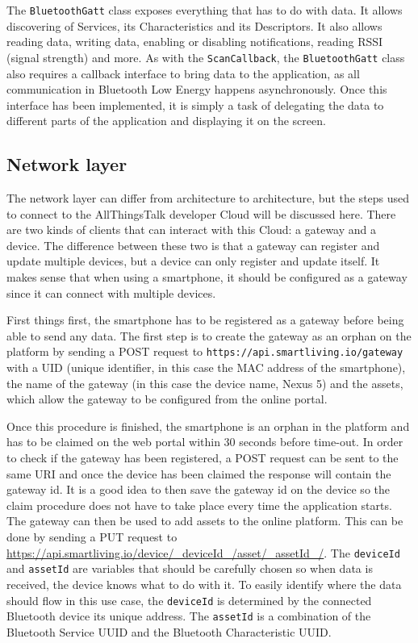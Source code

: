 \documentclass[pdftex,a4paper,12pt,twoside]{report}
\begin{document}
The \texttt{BluetoothGatt} class exposes everything that has to do with data. It allows discovering of Services, its Characteristics and its Descriptors. It also allows reading data, writing data, enabling or disabling notifications, reading RSSI (signal strength) and more. As with the \texttt{ScanCallback}, the \texttt{BluetoothGatt} class also requires a callback interface to bring data to the application, as all communication in Bluetooth Low Energy happens asynchronously. Once this interface has been implemented, it is simply a task of delegating the data to different parts of the application and displaying it on the screen.

\subsection{Network layer}
\label{subsec:networklayer}
The network layer can differ from architecture to architecture, but the steps used to connect to the AllThingsTalk developer Cloud will be discussed here. There are two kinds of clients that can interact with this Cloud: a gateway and a device. The difference between these two is that a gateway can register and update multiple devices, but a device can only register and update itself. It makes sense that when using a smartphone, it should be configured as a gateway since it can connect with multiple devices.

First things first, the smartphone has to be registered as a gateway before being able to send any data. The first step is to create the gateway as an orphan on the platform by sending a POST request to \texttt{https://api.smartliving.io/gateway} with a UID (unique identifier, in this case the MAC address of the smartphone), the name of the gateway (in this case the device name, Nexus 5) and the assets, which allow the gateway to be configured from the online portal.

Once this procedure is finished, the smartphone is an orphan in the platform and has to be claimed on the web portal within 30 seconds before time-out. In order to check if the gateway has been registered, a POST request can be sent to the same URI and once the device has been claimed the response will contain the gateway id. It is a good idea to then save the gateway id on the device so the claim procedure does not have to take place every time the application starts. The gateway can then be used to add assets to the online platform. This can be done by sending a PUT request to \url{https://api.smartliving.io/device/\_deviceId\_/asset/\_assetId\_/}. The \texttt{deviceId} and \texttt{assetId} are variables that should be carefully chosen so when data is received, the device knows what to do with it. To easily identify where the data should flow in this use case, the \texttt{deviceId} is determined by the connected Bluetooth device its unique address. The \texttt{assetId} is a combination of the Bluetooth Service UUID and the Bluetooth Characteristic UUID.
\end{document}
